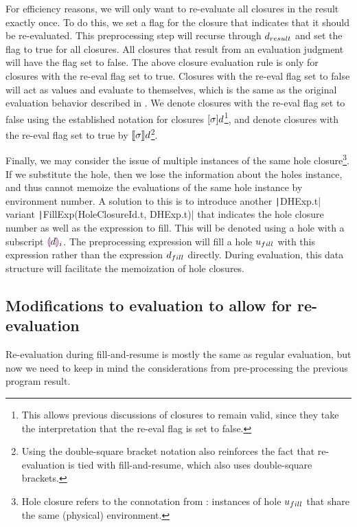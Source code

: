 For efficiency reasons, we will only want to re-evaluate all closures in the result exactly once. To do this, we set a flag for the closure that indicates that it should be re-evaluated. This preprocessing step will recurse through $d_{result}$ and set the flag to true for all closures. All closures that result from an evaluation judgment will have the flag set to false. The above closure evaluation rule is only for closures with the re-eval flag set to true. Closures with the re-eval flag set to false will act as values and evaluate to themselves, which is the same as the original evaluation behavior described in . We denote closures with the re-eval flag set to false using the established notation for closures $[\sigma]d$\footnote{This allows previous discussions of closures to remain valid, since they take the interpretation that the re-eval flag is set to false.}, and denote closures with the re-eval flag set to true by $\llbracket\sigma\rrbracket d$\footnote{Using the double-square bracket notation also reinforces the fact that re-evaluation is tied with fill-and-resume, which also uses double-square brackets.}.

Finally, we may consider the issue of multiple instances of the same hole closure\footnote{Hole closure refers to the connotation from : instances of hole $u_{fill}$ that share the same (physical) environment.}. If we substitute the hole, then we lose the information about the holes instance, and thus cannot memoize the evaluations of the same hole instance by environment number. A solution to this is to introduce another \texttt|DHExp.t| variant \texttt|FillExp(HoleClosureId.t, DHExp.t)| that indicates the hole closure number as well as the expression to fill. This will be denoted using a hole with a subscript $\textcolor{violet}{\llparenthesis} d\textcolor{violet}{\rrparenthesis}_i$. The preprocessing expression will fill a hole $u_{fill}$ with this expression rather than the expression $d_{fill}$ directly. During evaluation, this data structure will facilitate the memoization of hole closures.

\subsection{Modifications to evaluation to allow for re-evaluation}
\label{sec:re-eval}

Re-evaluation during fill-and-resume is mostly the same as regular evaluation, but now we need to keep in mind the considerations from pre-processing the previous program result.

